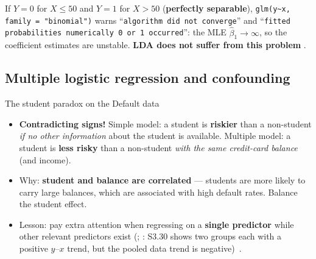 \begin{trap}
If $Y=0$ for $X\le50$ and $Y=1$ for $X>50$ (\textbf{perfectly separable}),
\texttt{glm(y\textasciitilde x, family = "binomial")} warns
``\texttt{algorithm did not converge}'' and ``\texttt{fitted probabilities numerically 0 or 1 occurred}'':
the MLE $\hat\beta_1\to\infty$, so the coefficient estimates are unstable. \textbf{LDA does not suffer
from this problem} .
\end{trap}

\subsection{Multiple logistic regression and confounding}

\begin{topic}{The student paradox on the Default data}
\par\noindent{}
\begin{itemize}
\item \textbf{Contradicting signs!} Simple model: a student is \textbf{riskier} than a non-student
  \emph{if no other information} about the student is available. Multiple model: a student is
  \textbf{less risky} than a non-student \emph{with the same credit-card balance} (and income).
\item Why: \textbf{student and balance are correlated} --- students are more likely to carry large balances,
  which are associated with high default rates. Balance  the student effect.
\item Lesson: pay extra attention when regressing on a \textbf{single predictor} while other relevant predictors
  exist (; : S3.30 shows two groups each with a positive
  $y$--$x$ trend, but the pooled data trend is negative) \,.
\end{itemize}
\end{topic}

